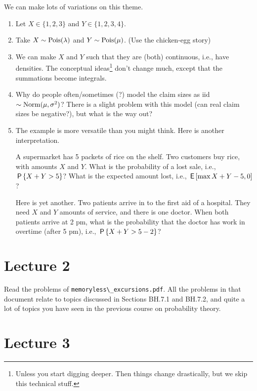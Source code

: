\begin{remark}
We can  make lots of variations on this theme.
\begin{enumerate}
\item Let $X\in \{1,2,3\}$ and $Y\in \{1,2,3,4\}$.
\item Take $X\sim\Pois{\lambda}$ and $Y\sim\Pois{\mu}$. (Use the chicken-egg story)
\item We can make $X$ and $Y$ such that they are (both) continuous, i.e., have densities.
  The conceptual ideas\footnote{Unless you start digging deeper.
    Then things change drastically, but we skip this technical stuff.}
  don't change much, except that the summations become integrals.
\item Why do people often/sometimes (?)
  model the claim sizes as iid $\sim\Norm{\mu, \sigma^{2}}$?
  There is a slight problem with this model (can real claim sizes be negative?), but what is the way out?
\item The example is more versatile than you might think. Here is another interpretation.

A supermarket has 5 packets of rice on the shelf.
Two customers buy rice, with amounts $X$ and $Y$.
What is the probability of a lost sale, i.e., $\P{X+Y>5}$?
What is the expected amount lost, i.e., $\E{ \max{X+Y - 5,0}}$?

Here is yet another.
Two patients arrive in to the first aid of a hospital.
They need $X$ and $Y$ amounts of service, and there is one doctor.
When both patients arrive at 2 pm, what is the probability that the doctor has work in overtime (after 5 pm), i.e., $\P{X+Y > 5- 2}$?
\end{enumerate}
\end{remark}

\section{Lecture 2}

Read the problems of \verb|memoryless\_excursions.pdf|.
All the problems in that document relate to topics discussed in Sections BH.7.1 and BH.7.2, and quite a lot of topics you have seen in the previous course on probability theory.


\section{Lecture 3}


